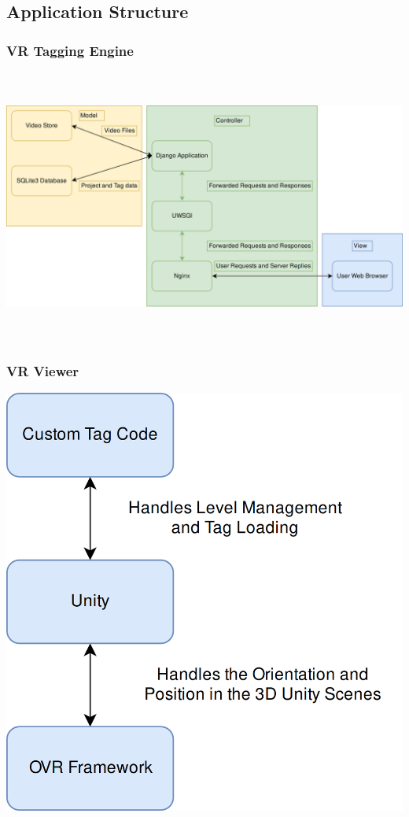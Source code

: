 \documentclass[12pt]{report}
\begin{document}
\subsection{Application Structure}
\subsubsection{VR Tagging Engine}
\begin{sideways}
\includegraphics[height=9cm]{application_struct}
\end{sideways}

\subsubsection{VR Viewer}
\includegraphics[height=\textwidth]{viewer_application_struct}
\end{document}
